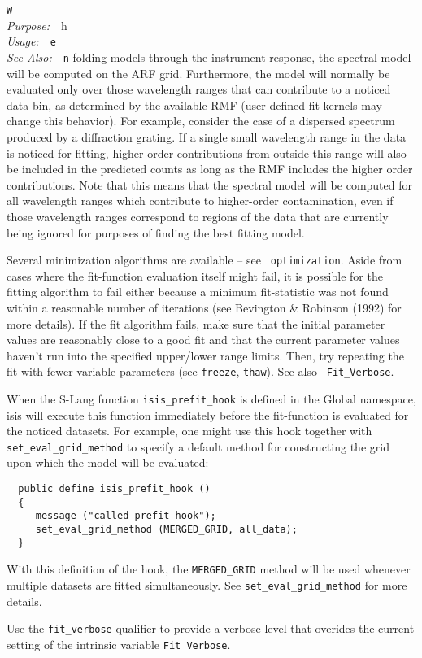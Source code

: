 \documentclass{book}
\makeatletter
\newif\ifpdf
\newenvironment{isisfunction}[4]%
{\index{{#1}@{\tt #1}}%
  \ifpdf
  \else
     \addcontentsline{toc}{subsection}{{#1} -- {#2}}
  \fi
  \vbox{
          \vspace*{\baselineskip}
          {\LARGE\tt #1}\vspace*{\baselineskip}\\
          {{\it Purpose:}~~{#2}}\\
          {{\it Usage:}~~{\tt #3}}\\
          {{\it See Also:}~~{\tt #4}}
       }
}%
{ }
\makeatother
\begin{document}
\begin{isisfunction}
When folding models through the instrument response, the spectral
model will be computed on the ARF grid. Furthermore, the model
will normally be evaluated only over those wavelength ranges that
can contribute to a noticed data bin, as determined by the
available RMF (user-defined fit-kernels may change this behavior).
For example, consider the case of a dispersed spectrum produced by
a diffraction grating. If a single small wavelength range in the
data is noticed for fitting, higher order contributions from
outside this range will also be included in the predicted counts
as long as the RMF includes the higher order contributions. Note
that this means that the spectral model will be computed for all
wavelength ranges which contribute to higher-order contamination,
even if those wavelength ranges correspond to regions of the data
that are currently being ignored for purposes of finding the best
fitting model.

Several minimization algorithms are available -- see {\tt
optimization}. Aside from cases where the fit-function
evaluation itself might fail, it is possible for the fitting
algorithm to fail either because a minimum fit-statistic was
not found within a reasonable number of iterations (see
Bevington \& Robinson (1992) for more details).  If the fit
algorithm fails, make sure that the initial parameter values
are reasonably close to a good fit and that the current
parameter values haven't run into the specified upper/lower
range limits. Then, try repeating the fit with fewer variable
parameters (see {\tt freeze}, {\tt thaw}). See also {\tt
Fit\_Verbose}.

When the S-Lang function \verb|isis_prefit_hook| is defined in
the Global namespace, isis will execute this function
immediately before the fit-function is evaluated for the
noticed datasets. For example, one might use this hook together
with \verb|set_eval_grid_method| to specify a default method
for constructing the grid upon which the model will be
evaluated:
\begin{verbatim}
  public define isis_prefit_hook ()
  {
     message ("called prefit hook");
     set_eval_grid_method (MERGED_GRID, all_data);
  }
\end{verbatim}
With this definition of the hook, the \verb|MERGED_GRID|
method will be used whenever multiple datasets are fitted
simultaneously. See \verb|set_eval_grid_method| for
more details.

Use the \verb|fit_verbose| qualifier to provide a verbose
level that overides the current setting of the
intrinsic variable \verb|Fit_Verbose|.

\end{isisfunction}
\end{document}
